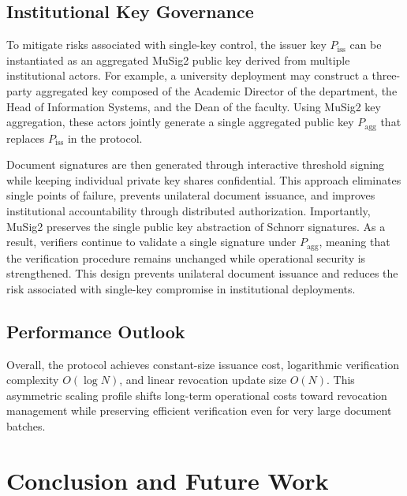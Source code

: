 \documentclass[preprint,12pt]{elsarticle}
\begin{document}
\subsection{Institutional Key Governance}

To mitigate risks associated with single-key control, the issuer key $P_{\mathrm{iss}}$ can be instantiated as an aggregated MuSig2 public key derived from multiple institutional actors.
For example, a university deployment may construct a three-party aggregated key composed of the Academic Director of the department, the Head of Information Systems, and the Dean of the faculty. 
Using MuSig2 key aggregation, these actors jointly generate a single aggregated public key $P_{\mathrm{agg}}$ that replaces $P_{\mathrm{iss}}$ in the protocol.

Document signatures are then generated through interactive threshold signing while keeping individual private key shares confidential. 
This approach eliminates single points of failure, prevents unilateral document issuance, and improves institutional accountability through distributed authorization.
Importantly, MuSig2 preserves the single public key abstraction of Schnorr signatures. 
As a result, verifiers continue to validate a single signature under $P_{\mathrm{agg}}$, meaning that the verification procedure remains unchanged while operational security is strengthened.
This design prevents unilateral document issuance and reduces the risk
associated with single-key compromise in institutional deployments.

\subsection{Performance Outlook}

Overall, the protocol achieves constant-size issuance cost, logarithmic verification complexity $O(\log N)$, and linear revocation update size $O(N)$. 
This asymmetric scaling profile shifts long-term operational costs toward revocation management while preserving efficient verification even for very large document batches.





\section{Conclusion and Future Work}
\label{sec_Conclusion}
\end{document}
